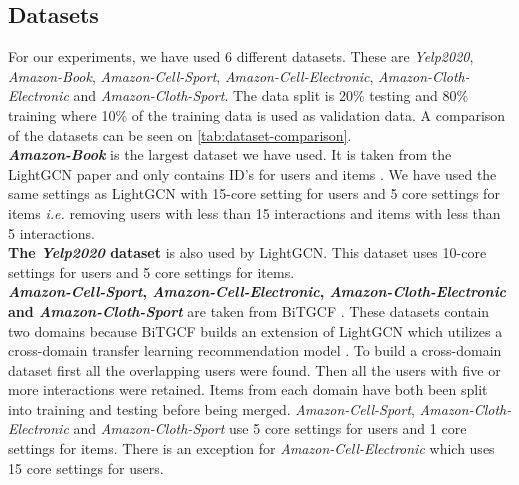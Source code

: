 \subsection{Datasets}
For our experiments, we have used 6 different datasets.
These are \textit{Yelp2020}, \textit{Amazon-Book}, \textit{Amazon-Cell-Sport}, \textit{Amazon-Cell-Electronic}, \textit{Amazon-Cloth-Electronic} and \textit{Amazon-Cloth-Sport}.
The data split is 20\% testing and 80\% training where 10\% of the training data is used as validation data.
A comparison of the datasets can be seen on \autoref{tab:dataset-comparison}.
\\
\textbf{\textit{Amazon-Book}} is the largest dataset we have used.
It is taken from the LightGCN paper and only contains ID's for users and items \cite{lightgcn}.
We have used the same settings as LightGCN with 15-core setting for users and 5 core settings for items \textit{i.e.} removing users with less than 15 interactions and items with less than 5 interactions.
\\
\textbf{The \textit{Yelp2020} dataset} is also used by LightGCN.
This dataset uses 10-core settings for users and 5 core settings for items.
\\
\textbf{\textit{Amazon-Cell-Sport}, \textit{Amazon-Cell-Electronic}, \textit{Amazon-Cloth-Electronic} and \textit{Amazon-Cloth-Sport}} are taken from BiTGCF \cite{BiTGCF}.
These datasets contain two domains because BiTGCF builds an extension of LightGCN which utilizes a cross-domain transfer learning recommendation model \cite{BiTGCF}.
To build a cross-domain dataset first all the overlapping users were found.
Then all the users with five or more interactions were retained.
Items from each domain have both been split into training and testing before being merged.
\textit{Amazon-Cell-Sport}, \textit{Amazon-Cloth-Electronic} and \textit{Amazon-Cloth-Sport} use 5 core settings for users and 1 core settings for items.
There is an exception for \textit{Amazon-Cell-Electronic} which uses 15 core settings for users.
